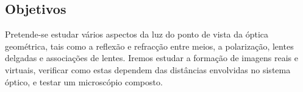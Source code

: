 \begin{center}
\begin{minipage}[c][3cm][c]{\textwidth}
\begin{center}
\section*{\centering Objetivos}
    \vspace{-3mm}
\small
\justify
Pretende-se estudar vários aspectos da luz do ponto de vista da óptica geométrica, tais como a reflexão e refracção
entre meios, a polarização, lentes delgadas e associações de lentes. Iremos estudar a formação de imagens reais e virtuais,
verificar como estas dependem das distâncias envolvidas no sistema óptico, e testar um microscópio composto.

    
\end{center}
\hline


\end{minipage}
\begin{minipage}[c][2cm][c]{\textwidth}
\centering

\end{minipage}

\end{center}